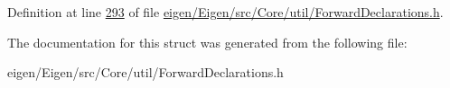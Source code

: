 Definition at line \hyperlink{eigen_2_eigen_2src_2_core_2util_2_forward_declarations_8h_source_l00293}{293} of file \hyperlink{eigen_2_eigen_2src_2_core_2util_2_forward_declarations_8h_source}{eigen/\+Eigen/src/\+Core/util/\+Forward\+Declarations.\+h}.



The documentation for this struct was generated from the following file\+:\begin{DoxyCompactItemize}
\item 
eigen/\+Eigen/src/\+Core/util/\+Forward\+Declarations.\+h\end{DoxyCompactItemize}
